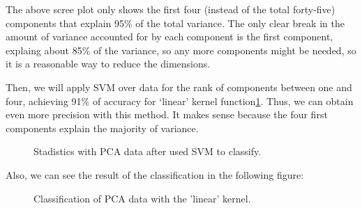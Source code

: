 The above scree plot only shows the first four (instead of the total forty-five) components that explain 95\% of the total variance. The only clear break in the amount of variance accounted for by each component is the first component, explaing about 85\% of the variance, so any more components might be needed, so it is  a reasonable way to reduce the dimensions.

Then, we will apply SVM over data for the rank of components between one and four, achieving 91\% of accuracy for ‘linear’ kernel function\ref{fig:stadistics_PCA}. Thus, we can obtain even more precision with this method. It makes sense because the four first components explain the majority of variance.

\begin{figure}[H]
	\centering
	\caption{Stadistics with PCA data after used SVM to classify.}
	\label{fig:stadistics_PCA}
\end{figure}

Also, we can see the result of the classification in the following figure:

\begin{figure}[H]
	\centering
	\caption{Classification of PCA data with the 'linear' kernel.}
	\label{fig:Classification3D_PCA}
\end{figure}
